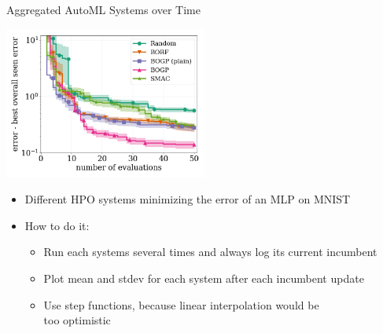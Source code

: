 \begin{frame}[c]{Aggregated AutoML Systems over Time}

\centering
\includegraphics[width=0.5\textwidth]{images/MLPOnMnist_tFalse.png}

\begin{itemize}
	\item Different HPO systems minimizing the error of an MLP on MNIST
	\item How to do it:
	\begin{itemize}
		\item Run each systems several times and always log its current incumbent 
		\item Plot mean and stdev for each system after each incumbent update
		\item Use step functions, because linear interpolation would be\\ too optimistic
	\end{itemize}
\end{itemize}

\end{frame}
